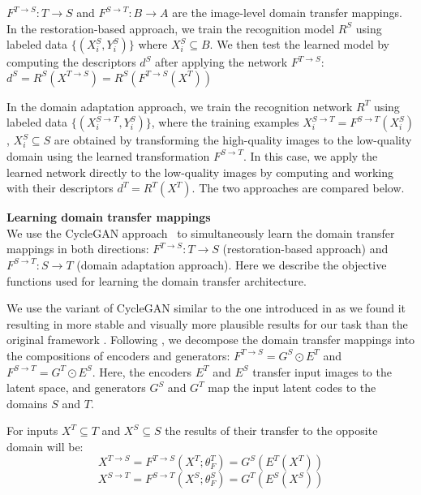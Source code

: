 $F^{T \rightarrow S}: T \longrightarrow S$ and $F^{S \rightarrow T}: B \longrightarrow A$ are the image-level domain transfer mappings. In the restoration-based approach, we train the recognition model $R^{S}$ using labeled data  $\{(X^{S}_{i}, Y^{S}_{i})\}$ where $X^{S}_{i} \subseteq B$. We then test the learned model by computing the descriptors $d^{S}$ after applying the network $F^{T \rightarrow S}$:  $d^{S} = R^{S}(X^{T\rightarrow S}) = R^{S}(F^{T \rightarrow S}(X^{T}))$

In the domain adaptation approach, we train the recognition network $R^{T}$ using labeled data $\{(X^{S \rightarrow T}_{i}, Y^{S}_{i})\}$, where the training examples $X^{S \rightarrow T }_{i} = F^{S \rightarrow T}(X^{S}_i)$, $X^{S}_i \subseteq S$ are obtained by transforming the high-quality images to the low-quality domain using the learned transformation $F^{S \rightarrow T}$. In this case, we apply the learned network directly to the low-quality images by computing and working with their descriptors $d^{T} = R^{T}(X^{T})$. The two approaches are compared below.


\bigskip
\indent\textbf{Learning domain transfer mappings}\\
\label{sect:domain_transfer}
We use the CycleGAN approach~\citep{ZhuPIE17} to simultaneously learn the domain transfer mappings in both directions: $ F^{T \rightarrow S}: T  \longrightarrow S$ (restoration-based approach) and  $F^{S \rightarrow T}: S \longrightarrow T$ (domain adaptation approach). Here we describe the objective functions used for learning the domain transfer architecture.

We use the variant of CycleGAN similar to the one introduced in \citep{LiuNIPS2017} as we found it resulting in more stable and visually more plausible results for our task than the original framework \citep{ZhuPIE17}. Following \citep{LiuNIPS2017}, we decompose the domain transfer mappings into the compositions of encoders and generators: $F^{T \rightarrow S} = G^{S} \odot E^{T} $ and $F^{S \rightarrow T} = G^{T} \odot E^{S} $. Here, the encoders $E^{T}$ and $E^{S}$ transfer input images to the latent space, and generators $G^{S}$ and $G^{T}$ map the input latent codes to the domains $S$ and $T$.
 
For inputs $X^{T} \subseteq T $ and $X^{S} \subseteq S $ the results of their transfer to the opposite domain will be:
\begin{equation}
    X^{T \rightarrow S} = F^{T \rightarrow S}(X^{T}; \theta^{T}_F) = G^{S}(E^{T}(X^{T}))  
\end{equation}
\begin{equation}
    X^{S \rightarrow T} = F^{S \rightarrow T}(X^{S}; \theta^{S}_F) = G^{T}(E^{S}(X^{S}))
\end{equation}

